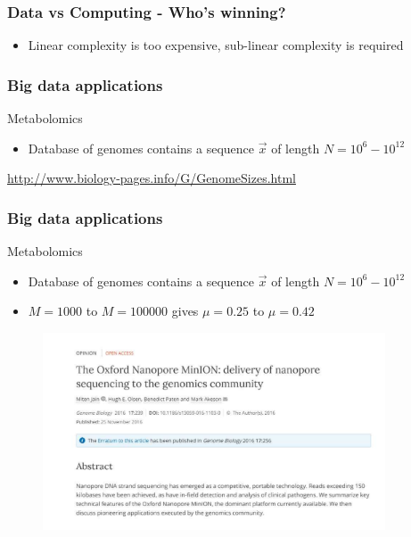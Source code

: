 \documentclass[10pt,xcolor=table]{beamer}
\begin{document}
\begin{frame}\frametitle{Data vs Computing - Who's winning?}

\pause
\begin{itemize}
\item Linear complexity is too expensive, sub-linear complexity is required
\end{itemize}

\end{frame}
\begin{frame}\frametitle{Big data applications}
\begin{block}{Metabolomics}
\begin{itemize}
  \item Database of genomes contains a sequence $\vec{x}$ of length $N=10^{6}-10^{12}$
\end{itemize}

\end{block}
  \begin{figure}[h]
  \end{figure}

\url{http://www.biology-pages.info/G/GenomeSizes.html}
\end{frame}
\begin{frame}\frametitle{Big data applications}
\begin{block}{Metabolomics}
\begin{itemize}
  \item Database of genomes contains a sequence $\vec{x}$ of length $N=10^{6}-10^{12}$
  \item $M=1000$ to $M = 100000$ gives $\mu = 0.25$ to $\mu = 0.42$
\end{itemize}

  \begin{figure}[h]
  \includegraphics[width=4.0in]{genomebiology}
  \end{figure}


\end{block}

\end{frame}
\end{document}
